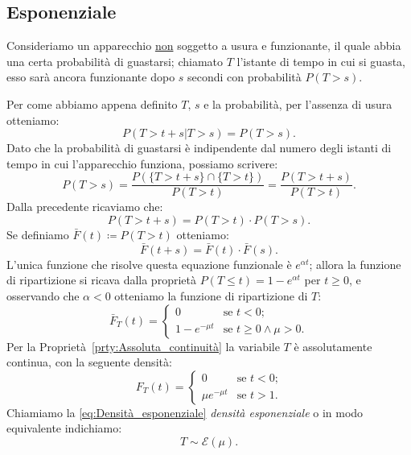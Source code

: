         \subsection{Esponenziale}\label{sec:Densità_Esponenziale}
            \begin{defn}
                Consideriamo un apparecchio \underline{non} soggetto a usura e funzionante, il quale abbia una certa probabilità di guastarsi; chiamato $T$ l'istante di tempo in cui si guasta, esso sarà ancora funzionante dopo $s$ secondi con probabilità $P(T > s)$.

                Per come abbiamo appena definito $T,\,s$ e la probabilità, per l'assenza di usura otteniamo: \[
                    P(T > t + s | T > s) = P(T > s)
                .\] Dato che la probabilità di guastarsi è indipendente dal numero degli istanti di tempo in cui l'apparecchio funziona, possiamo scrivere: \[
                P(T > s) = \frac{P(\{T > t + s\} \cap \{T > t\})}{P(T > t)} = \frac{P(T > t+s)}{P(T > t)}
                .\] Dalla precedente ricaviamo che: \[
                P(T > t + s) = P(T > t) \cdot P(T > s)
            .\] Se definiamo $\bar{F}(t) \coloneqq P(T > t)$ otteniamo: \[
                \bar{F}(t + s) = \bar{F}(t) \cdot \bar{F}(s)
            .\] L'unica funzione che risolve questa equazione funzionale è $e^{\alpha t}$; allora la funzione di ripartizione si ricava dalla proprietà $P(T \leq t) = 1 - e^{\alpha t}$ per $t \geq 0$, e osservando che $\alpha < 0$ otteniamo la funzione di ripartizione di $T$: \[
            \bar{F}_T(t) = \begin{cases}
                0 & \text{se $t < 0$;} \\
                1 - e^{-\mu t} & \text{se $t \geq 0 \land \mu > 0$.}
            \end{cases}
            \] Per la Proprietà~\ref{prty:Assoluta_continuità} la variabile $T$ è assolutamente continua, con la seguente densità:
            \begin{equation}\label{eq:Densità_esponenziale} 
                F_T(t) = \begin{cases}
                    0 & \text{se $t < 0$;} \\
                    \mu e^{-\mu t} & \text{se $t > 1$.}
                \end{cases}
           \end{equation}
            Chiamiamo la \eqref{eq:Densità_esponenziale} \emph{densità esponenziale} o in modo equivalente indichiamo: \[
                T \sim \mathcal{E}(\mu)
            .\]
            \end{defn}
